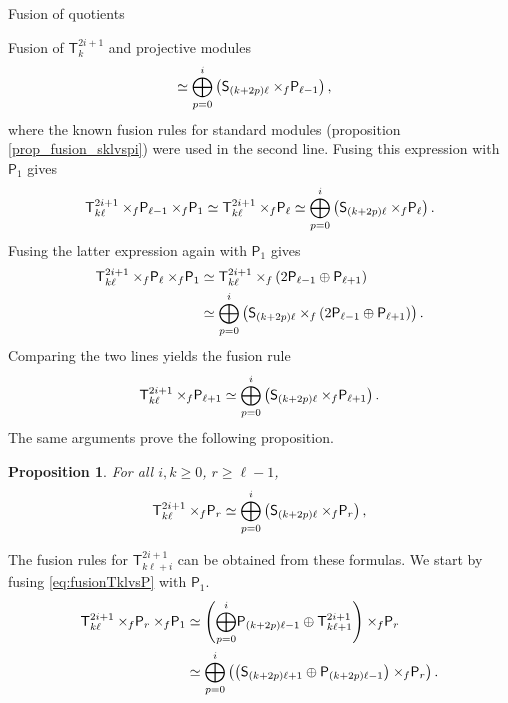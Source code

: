 \documentclass[reqno]{amsart}
\newtheorem{Prop}[Thm]{Proposition}
\newcommand{\ds}[1]{\mathsf S_{#1}}
\newcommand{\dP}[1]{\mathsf P_{#1}}
\newcommand{\xf}{\times\hspace{-0.27em}_f}
\newcommand{\T}[2]{\mathsf{T}^{#1}_{#2}}
\newcommand{\lc}{\ell}
\begin{document}
\begin{section}{Fusion of quotients}
\begin{subsection}{Fusion of $\T{2i+1}{k}$ and projective modules}
\begin{align}
	& \simeq \overset{i}{\underset{p=0}{\bigoplus}}\left( \ds{(k+2p)\lc} \xf \dP{\lc-1}\right) ,
\end{align}
where the known fusion rules for standard modules (proposition \ref{prop_fusion_sklvspi}) were used in the second line. Fusing this expression with $\dP{1}$ gives
\begin{equation*}
\T{2i+1}{k\lc} \xf \dP{\lc-1} \xf \dP{1} \simeq \T{2i+1}{k\lc} \xf \dP{\lc} \simeq \overset{i}{\underset{p=0}{\bigoplus}}\left( \ds{(k+2p)\lc} \xf \dP{\lc}\right) .
\end{equation*}
Fusing the latter expression again with $\dP{1}$ gives
\begin{align*}
	\T{2i+1}{k\lc} \xf \dP{\lc} \xf \dP{1} & \simeq \T{2i+1}{k\lc} \xf \left(2\dP{\lc-1} \oplus \dP{\lc+1}\right)\\
		& \simeq \overset{i}{\underset{p=0}{\bigoplus}}\left( \ds{(k+2p)\lc} \xf\left( 2\dP{\lc-1} \oplus \dP{\lc+1}\right)\right).
\end{align*}
Comparing the two lines yields the fusion rule
\begin{equation*}
	\T{2i+1}{k\lc} \xf \dP{\lc+1} \simeq \overset{i}{\underset{p=0}{\bigoplus}}\left( \ds{(k+2p)\lc} \xf \dP{\lc+1}\right). 
\end{equation*}
The same arguments prove the following proposition.%
\begin{Prop}\label{prop:fusionTvsP}
For all $i, k  \geq 0$, $r\geq \lc-1$,
\begin{equation}\label{eq:fusionTklvsP}
	\T{2i+1}{k\lc} \xf \dP{r} \simeq \overset{i}{\underset{p=0}{\bigoplus}}\left( \ds{(k+2p)\lc} \xf \dP{r}\right),
\end{equation}
\end{Prop}
The fusion rules for $\T{2i+1}{k\lc +i}$ can be obtained from these formulas. We start by fusing \eqref{eq:fusionTklvsP} with $\dP{1}$.
\begin{align*}
	\T{2i+1}{k\lc} \xf \dP{r} \xf \dP{1} & \simeq \left(\overset{i}{\underset{p=0}{\bigoplus}} \dP{(k+2p)\lc-1} \oplus \T{2i+1}{k\lc +1} \right)\xf \dP{r} \\
	& \simeq \overset{i}{\underset{p=0}{\bigoplus}}\left(\left( \ds{(k+2p)\lc+1} \oplus \dP{(k+2p)\lc-1}\right) \xf \dP{r}\right).
\end{align*}

\end{subsection}
\end{section}
\end{document}
